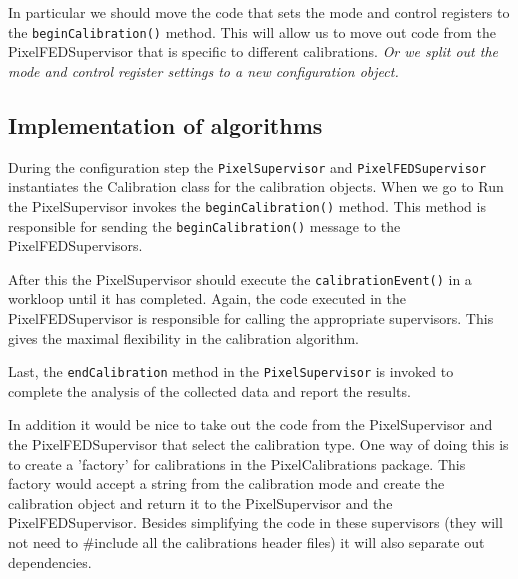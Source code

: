 In particular we should move the code that sets the mode
and control registers to the {\tt beginCalibration()} method.
This will allow us to move out code from the PixelFEDSupervisor
that is specific to different calibrations. {\it Or we split
out the mode and control register settings to a new configuration
object.}

\subsection{Implementation of algorithms}

During the configuration step the {\tt PixelSupervisor} and
{\tt PixelFEDSupervisor}
instantiates the Calibration class for the calibration objects.
When we go to Run the PixelSupervisor invokes the {\tt beginCalibration()}
method. This method is responsible for sending the {\tt beginCalibration()}
message to the PixelFEDSupervisors. 

After this the PixelSupervisor should execute the {\tt calibrationEvent()}
in a workloop until it has completed. Again, the code executed in the
PixelFEDSupervisor is responsible for calling the appropriate 
supervisors. This gives the maximal flexibility in the calibration
algorithm.

Last, the {\tt endCalibration} method in the {\tt PixelSupervisor} is
invoked to complete the analysis of the collected data and report
the results.

In addition it would be nice to take out the code from the PixelSupervisor
and the PixelFEDSupervisor that select the calibration type. One
way of doing this is to create a 'factory' for calibrations in the 
PixelCalibrations package. This factory would accept a string from
the calibration mode and create the calibration object and return
it to the PixelSupervisor and the PixelFEDSupervisor. Besides
simplifying the code in these supervisors (they will not need to \#include
all the calibrations header files) it will also separate out dependencies.
